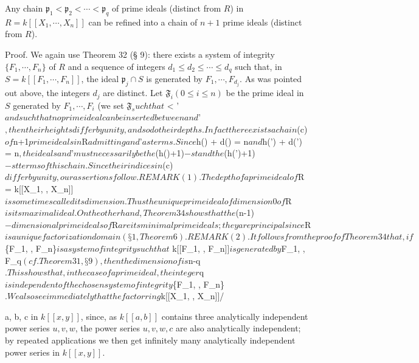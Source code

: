 Any chain $\mathfrak{p}_1 < \mathfrak{p}_2 < \cdots < \mathfrak{p}_q$ of prime ideals (distinct from $R$) in $R = k[[X_1, \cdots, X_n]]$ can be refined into a chain of $n+1$ prime ideals (distinct from $R$).

Proof. We again use Theorem 32 (§ 9): there exists a system of integrity $\{F_1, \cdots, F_n\}$ of $R$ and a sequence of integers $d_1 \leq d_2 \leq \cdots \leq d_q$ such that, in $S = k[[F_1, \cdots, F_n]]$, the ideal $\mathfrak{p}_j \cap S$ is generated by $F_1, \cdots, F_{d_j}$. As was pointed out above, the integers $d_j$ are distinct. Let $\mathfrak{F}_i (0 \leq i \leq n)$ be the prime ideal in $S$ generated by $F_1, \cdots, F_i$ (we set $\mathfrak{F}_

such that $ < '$ and such that no prime ideal can be inserted between $$ and $'$, then their heights differ by unity, and so do their depths.

In fact there exists a chain $(c)$ of $n+1$ prime ideals in $R$ admitting $$ and $'$ as terms. Since $h() + d() = n$ and $h(') + d(') = n$, the ideals $$ and $'$ must necessarily be the $(h()+1)$-st and the $(h(')+1)$-st terms of this chain. Since their indices in $(c)$ differ by unity, our assertions follow.

REMARK (1). The depth of a prime ideal $$ of $R = k[[X_1, \cdots, X_n]]$ is sometimes called its dimension. Thus the unique prime ideal of dimension 0 of $R$ is its maximal ideal. On the other hand, Theorem 34 shows that the $(n-1)$-dimensional prime ideals of $R$ are its minimal prime ideals; they are principal since $R$ is a unique factorization domain (§1, Theorem 6).

REMARK (2). It follows from the proof of Theorem 34 that, if $\{F_1, \cdots, F_n\}$ is a system of integrity such that $ \cap k[[F_1, \cdots, F_n]]$ is generated by $F_1, \cdots, F_q$ (cf. Theorem 31, §9), then the dimension of $$ is $n-q$. This shows that, in the case of a prime ideal, the integer $q$ is independent of the chosen system of integrity $\{F_1, \cdots, F_n\}$. We also see immediately that the factor ring $k[[X_1, \cdots, X_n]]/\math

a, b, c in $k[[x, y]]$, since, as $k[[a, b]]$ contains three analytically independent power series $u, v, w$, the power series $u, v, w, c$ are also analytically independent; by repeated applications we then get infinitely many analytically independent power series in $k[[x, y]]$.

